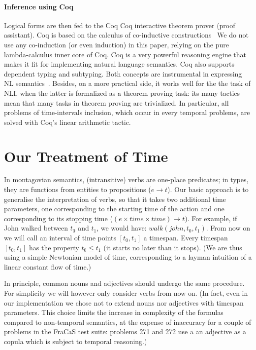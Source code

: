 \documentclass[a4paper,twoside]{article}
\begin{document}
\paragraph{Inference using Coq}
Logical forms are then fed to the Coq
Coq interactive theorem prover (proof assistant). Coq is based on
the calculus of co-inductive constructions~\citep{werner_une_1994} We
do not use any co-induction (or even induction) in this paper, relying
on the pure lambda-calculus inner core of Coq.  Coq is a very powerful
reasoning engine that makes it fit for implementing natural language
semantics.  Coq also supports  dependent typing and 
 subtyping. Both concepts are instrumental in expressing NL
semantics~\citep{chatzikyriakidis_natural_2014}.  Besides, on a more
practical side, it works well for the the task of NLI, when the latter
is formalized as a theorem proving task: its many tactics mean that
many tasks in theorem proving are trivialized. In particular, all
problems of time-intervals inclusion, which occur in every temporal
problems, are solved with Coq's linear arithmetic tactic.

\section{Our Treatment of Time}
\label{sec:our-semantics}

In montagovian semantics, (intransitive) verbs are one-place
predicates; in types, they are functions from entities to propositions
($e \to t$).  Our basic approach is to generalise the interpretation of 
verbs, so that it takes two
additional time parameters, one corresponding to the starting time
of the action and one corresponding to its stopping time ($(e × time × time) \to t$). For example,
if John walked between $t_0$ and $t_1$, we would have:
$walk(john,t_0,t_1)$. From now on we will call an interval of time
points $[t_0,t_1]$ a timespan. Every timespan $[t_0,t_1]$ has the
property $t_0 ≤ t_1$ (it starts no later than it stops). (We are thus
using a simple Newtonian model of time, corresponding to a layman
intuition of a linear constant flow of time.)

In principle, common nouns and adjectives should undergo the same
procedure. For simplicity we will however only consider verbs from now
on. (In fact, even in our implementation we chose not to extend nouns
nor adjectives with timespan parameters. This choice limits the
increase in complexity of the formulas compared to non-temporal
semantics, at the expense of inaccuracy for a couple of problems in
the FraCaS test suite: problems 271 and 272 use a an adjective as a
copula which is subject to temporal reasoning.)
\end{document}
